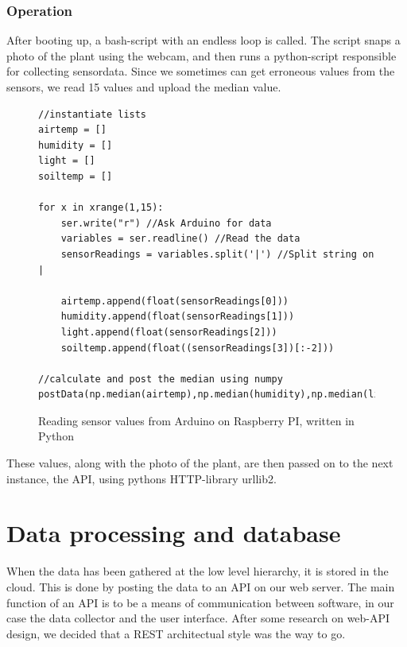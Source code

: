 \subsubsection{Operation}
After booting up, a bash-script with an endless loop is called. The script snaps a photo of the plant using the webcam, and then runs a python-script responsible for collecting sensordata. Since we sometimes can get erroneous values from the sensors, we read 15 values and upload the median value.

\lstset{language=Python} 
\begin{figure}
\begin{lstlisting}
//instantiate lists
airtemp = []
humidity = []
light = []
soiltemp = [] 

for x in xrange(1,15): 
	ser.write("r") //Ask Arduino for data
	variables = ser.readline() //Read the data
	sensorReadings = variables.split('|') //Split string on |

	airtemp.append(float(sensorReadings[0]))
	humidity.append(float(sensorReadings[1]))
	light.append(float(sensorReadings[2]))
	soiltemp.append(float((sensorReadings[3])[:-2])) 

//calculate and post the median using numpy
postData(np.median(airtemp),np.median(humidity),np.median(light),np.median(soiltemp)) 
\end{lstlisting}
\caption{Reading sensor values from Arduino on Raspberry PI, written in Python}
\label{fig:raspberrycode}
\end{figure}

These values, along with the photo of the plant, are then passed on to the next instance, the API, using pythons HTTP-library urllib2. 

\section{Data processing and database}
When the data has been gathered at the low level hierarchy, it is stored in the cloud. This is done by posting the data to an API on our web server. The main function of an API is to be a means of communication between software, in our case the data collector and the user interface. After some research on web-API design, we decided that a REST architectual style was the way to go. 

